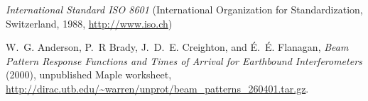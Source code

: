 \begin{thebibliography}{1}
  \textit{International Standard ISO 8601} (International Organization for
  Standardization, Switzerland, 1988, \url{http://www.iso.ch})
  
 W.~G. Anderson, P.~R Brady, J.~D.~E. Creighton,
  and \'E.~\'E. Flanagan, \emph{Beam Pattern Response Functions and
  Times of Arrival for Earthbound Interferometers} (2000), unpublished
  Maple worksheet,
  \url{http://dirac.utb.edu/~warren/unprot/beam_patterns_260401.tar.gz}.
  
\end{thebibliography}

